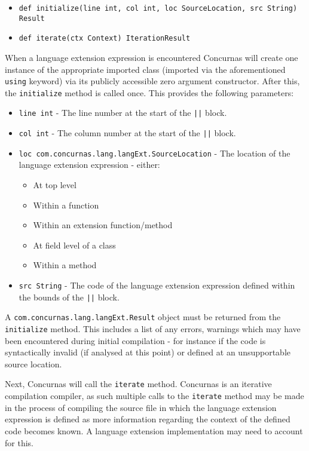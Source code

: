 \documentclass[conc-doc]{subfiles}
\begin{document}
\begin{itemize}
	\item \lstinline{def initialize(line int, col int, loc SourceLocation, src String) Result}
	\item \lstinline{def iterate(ctx Context) IterationResult}
\end{itemize}

When a language extension expression is encountered Concurnas will create one instance of the appropriate imported class (imported via the aforementioned \lstinline{using} keyword) via its publicly accessible zero argument constructor. After this, the \lstinline{initialize} method is called once. This provides the following parameters:

\begin{itemize}
	\item \lstinline{line int} - The line number at the start of the \lstinline{||} block.
	\item \lstinline{col int} - The column number at the start of the \lstinline{||} block.
	\item \lstinline{loc com.concurnas.lang.langExt.SourceLocation} - The location of the language extension expression - either:
	\begin{itemize}
		\item At top level
		\item Within a function
		\item Within an extension function/method
		\item At field level of a class
		\item Within a method		 
	\end{itemize}	
	\item \lstinline{src String} - The code of the language extension expression defined within the bounds of the \lstinline{||} block.
\end{itemize}

A \lstinline{com.concurnas.lang.langExt.Result} object must be returned from the \lstinline{initialize} method. This includes a list of any errors, warnings which may have been encountered during initial compilation - for instance if the code is syntactically invalid (if analysed at this point) or defined at an unsupportable source location.

Next, Concurnas will call the \lstinline{iterate} method. Concurnas is an iterative compilation compiler, as such multiple calls to the \lstinline{iterate} method may be made in the process of compiling the source file in which the language extension expression is defined as more information regarding the context of the defined code becomes known. A language extension implementation may need to account for this.
\end{document}
